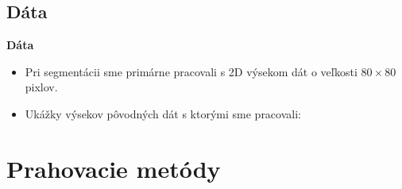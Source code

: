 \documentclass{beamer}
\begin{document}
\subsection{Dáta}
\begin{frame}{\textbf{Dáta}}
	\begin{itemize}
	\item Pri segmentácii sme primárne pracovali s 2D výsekom dát o veľkosti $80\times80$ pixlov.
	\item Ukážky výsekov pôvodných dát s ktorými sme pracovali:
	\end{itemize}
	\begin{figure}
	\centering
	  \qquad
      	  \qquad
      	  \qquad
	\end{figure}
\end{frame}

\section{Prahovacie metódy}  
\end{document}
